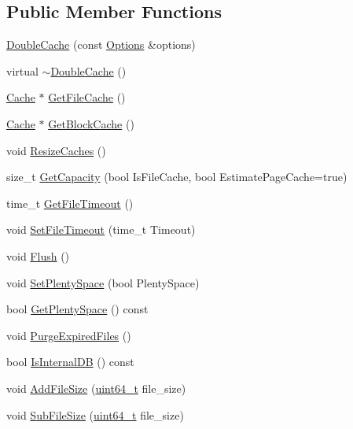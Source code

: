 \subsection*{Public Member Functions}
\begin{DoxyCompactItemize}
\item 
\hyperlink{classleveldb_1_1_double_cache_aa80459749d2af00553a595605ab74d35}{Double\+Cache} (const \hyperlink{structleveldb_1_1_options}{Options} \&options)
\item 
virtual \hyperlink{classleveldb_1_1_double_cache_a18dabb9c4af1f20f9814ac590ac923a7}{$\sim$\+Double\+Cache} ()
\item 
\hyperlink{classleveldb_1_1_cache}{Cache} $\ast$ \hyperlink{classleveldb_1_1_double_cache_a723f6ffc2d228ec2daf8702eb374c37e}{Get\+File\+Cache} ()
\item 
\hyperlink{classleveldb_1_1_cache}{Cache} $\ast$ \hyperlink{classleveldb_1_1_double_cache_a3dccddd49cdc0250202f97ac093f467b}{Get\+Block\+Cache} ()
\item 
void \hyperlink{classleveldb_1_1_double_cache_a8ba97644659ef0058ab0a2a541044ee1}{Resize\+Caches} ()
\item 
size\+\_\+t \hyperlink{classleveldb_1_1_double_cache_a42b19bd43e44d932aed9daf7947c5d0f}{Get\+Capacity} (bool Is\+File\+Cache, bool Estimate\+Page\+Cache=true)
\item 
time\+\_\+t \hyperlink{classleveldb_1_1_double_cache_a68d772fd35a1cd23fbf195e8f08c6539}{Get\+File\+Timeout} ()
\item 
void \hyperlink{classleveldb_1_1_double_cache_a5e687f62f87884202086ab890591068d}{Set\+File\+Timeout} (time\+\_\+t Timeout)
\item 
void \hyperlink{classleveldb_1_1_double_cache_aff1207d4dc959ab2227f182105e248c0}{Flush} ()
\item 
void \hyperlink{classleveldb_1_1_double_cache_a33df7beca9ec590b21700e6cf23039f1}{Set\+Plenty\+Space} (bool Plenty\+Space)
\item 
bool \hyperlink{classleveldb_1_1_double_cache_abc4f14335791748ac5c3b27460949624}{Get\+Plenty\+Space} () const 
\item 
void \hyperlink{classleveldb_1_1_double_cache_a466d4143eb43c72c17480f33ee401056}{Purge\+Expired\+Files} ()
\item 
bool \hyperlink{classleveldb_1_1_double_cache_a3c4b605684af6aa851593e34cb7f64e1}{Is\+Internal\+D\+B} () const 
\item 
void \hyperlink{classleveldb_1_1_double_cache_a46903228064dc108fb9b21d189337b1c}{Add\+File\+Size} (\hyperlink{stdint_8h_aaa5d1cd013383c889537491c3cfd9aad}{uint64\+\_\+t} file\+\_\+size)
\item 
void \hyperlink{classleveldb_1_1_double_cache_a21f96b1103106b8b94162088f0b784ab}{Sub\+File\+Size} (\hyperlink{stdint_8h_aaa5d1cd013383c889537491c3cfd9aad}{uint64\+\_\+t} file\+\_\+size)
\end{DoxyCompactItemize}
